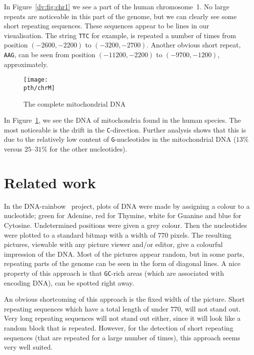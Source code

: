 \documentclass[oribibl]{lncs/llncs}
\begin{document}
In Figure~\ref{dv:fig:chr1} we see a part of the human chromosome~1. No large
repeats are noticeable in this part of the genome, but we can clearly see some
short repeating sequences. These sequences appear to be lines in our
visualisation. The string \texttt{TTC} for example, is repeated a number of
times from position $(-2600, -2200)$ to $(-3200, -2700)$. Another obvious short
repeat, \texttt{AAG}, can be seen from position $(-11200, -2200)$ to $(-9700,
-1200)$, approximately.

\begin{figure}[H]
\begin{center}
\texttt{[image: \\pth/chrM]}
\caption{The complete mitochondrial DNA}
\label{dv:fig:chrM}
\end{center}
\vspace*{-5mm}
\end{figure}

In Figure~\ref{dv:fig:chrM}, we see the DNA of mitochondria found in the human
species. The most noticeable is the drift in the \texttt{C}-direction. Further
analysis shows that this is due to the relatively low content of
\texttt{G}-nucleotides in the mitochondrial DNA ($13\%$ versus $25$--$31\%$ for
the other nucleotides).

\section{Related work}\label{dv:sec:rel}
In the DNA-rainbow~\cite{BK} project, plots of DNA were made by assigning a
colour to a nucleotide; green for Adenine, red for Thymine, white for Guanine
and blue for Cytosine. Undetermined positions were given a grey colour. Then
the nucleotides were plotted to a standard bitmap with a width of $770$ pixels.
The resulting pictures, viewable with any picture viewer and/or editor, give a
colourful impression of the DNA. Most of the pictures appear random, but in
some parts, repeating parts of the genome can be seen in the form of diagonal
lines. A nice property of this approach is that \texttt{GC}-rich areas (which
are associated with encoding DNA), can be spotted right away. 

An obvious shortcoming of this approach is the fixed width of the picture.
Short repeating sequences which have a total length of under $770$, will not
stand out. Very long repeating sequences will not stand out either, since it 
will look like a random block that is repeated. 
However, for the detection of short repeating sequences (that are repeated for
a large number of times), this approach seems very well suited.
\end{document}
